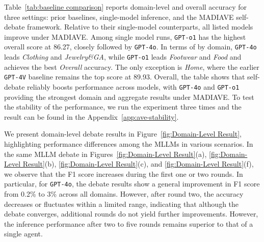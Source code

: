 \documentclass[11pt]{article}
\newcommand{\modelname}{MADIAVE}
\begin{document}
Table~\ref{tab:baseline comparison} reports domain-level and overall accuracy for three settings: prior baselines, single-model inference, and the \textsc{\modelname} self-debate framework. Relative to their single-model counterparts, all listed models improve under \textsc{\modelname}. Among single model runs, \texttt{GPT-o1} has the highest overall score at 86.27, closely followed by \texttt{GPT-4o}. In terms of by domain, \texttt{GPT-4o} leads \emph{Clothing} and \emph{Jewelry\&GA}, while \texttt{GPT-o1} leads \emph{Footwear} and \emph{Food} and achieves the best \emph{Overall} accuracy. The only exception is \emph{Home}, where the earlier \texttt{GPT-4V} baseline remains the top score at 89.93. Overall, the table shows that self-debate reliably boosts performance across models, with \texttt{GPT-4o} and \texttt{GPT-o1} providing the strongest domain and aggregate results under \textsc{\modelname}. To test the stability of the performance, we run the experiment three times and the result can be found in the Appendix~\ref{app:ave-stability}.






We present domain-level debate results in Figure~\ref{fig:Domain-Level Result}, highlighting performance differences among the MLLMs in various scenarios. In the same MLLM debate in Figures~\ref{fig:Domain-Level Result}(a), \ref{fig:Domain-Level Result}(b), \ref{fig:Domain-Level Result}(c), and \ref{fig:Domain-Level Result}(f), we observe that the F1 score increases during the first one or two rounds. In particular, for \texttt{GPT-4o}, the debate results show a general improvement in F1 score from 0.2\% to 3\% across all domains. However, after round two, the accuracy decreases or fluctuates within a limited range, indicating that although the debate converges, additional rounds do not yield further improvements. However, the inference performance after two to five rounds remains superior to that of a single agent.
\end{document}
